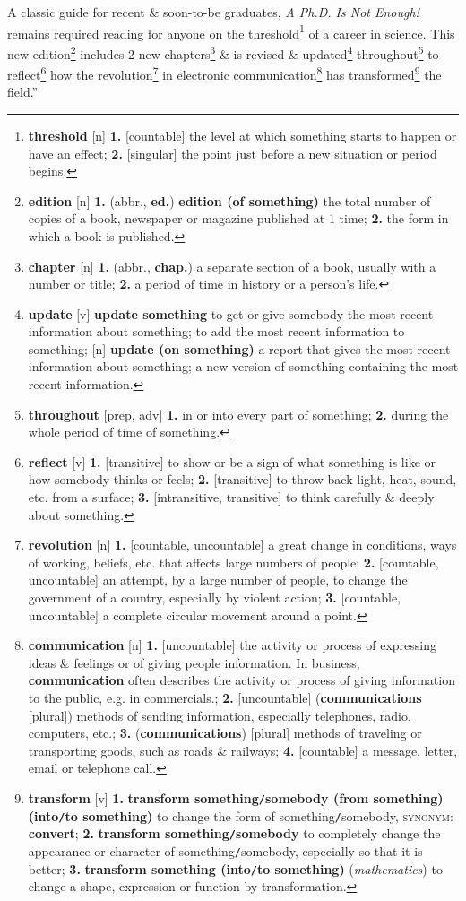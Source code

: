 \documentclass[oneside]{book}
\numberwithin{equation}{section}
\begin{document}
A classic guide for recent \& soon-to-be graduates, \textit{A Ph.D. Is Not Enough!} remains required reading for anyone on the threshold\footnote{\textbf{threshold} [n] \textbf{1.} [countable] the level at which something starts to happen or have an effect; \textbf{2.} [singular] the point just before a new situation or period begins.} of a career in science. This new edition\footnote{\textbf{edition} [n] \textbf{1.} (abbr., \textbf{ed.}) \textbf{edition (of something)} the total number of copies of a book, newspaper or magazine published at 1 time; \textbf{2.} the form in which a book is published.} includes 2 new chapters\footnote{\textbf{chapter} [n] \textbf{1.} (abbr., \textbf{chap.}) a separate section of a book, usually with a number or title; \textbf{2.} a period of time in history or a person's life.} \& is revised \& updated\footnote{\textbf{update} [v] \textbf{update something} to get or give somebody the most recent information about something; to add the most recent information to something; [n] \textbf{update (on something)} a report that gives the most recent information about something; a new version of something containing the most recent information.} throughout\footnote{\textbf{throughout} [prep, adv] \textbf{1.} in or into every part of something; \textbf{2.} during the whole period of time of something.} to reflect\footnote{\textbf{reflect} [v] \textbf{1.} [transitive] to show or be a sign of what something is like or how somebody thinks or feels; \textbf{2.} [transitive] to throw back light, heat, sound, etc. from a surface; \textbf{3.} [intransitive, transitive] to think carefully \& deeply about something.} how the revolution\footnote{\textbf{revolution} [n] \textbf{1.} [countable, uncountable] a great change in conditions, ways of working, beliefs, etc. that affects large numbers of people; \textbf{2.} [countable, uncountable] an attempt, by a large number of people, to change the government of a country, especially by violent action; \textbf{3.} [countable, uncountable] a complete circular movement around a point.} in electronic communication\footnote{\textbf{communication} [n] \textbf{1.} [uncountable] the activity or process of expressing ideas \& feelings or of giving people information. In business, \textbf{communication} often describes the activity or process of giving information to the public, e.g. in commercials.; \textbf{2.} [uncountable] (\textbf{communications} [plural]) methods of sending information, especially telephones, radio, computers, etc.; \textbf{3.} (\textbf{communications}) [plural] methods of traveling or transporting goods, such as roads \& railways; \textbf{4.} [countable] a message, letter, email or telephone call.} has transformed\footnote{\textbf{transform} [v] \textbf{1.} \textbf{transform something\texttt{/}somebody (from something) (into\texttt{/}to something)} to change the form of something\texttt{/}somebody, \textsc{synonym}: \textbf{convert}; \textbf{2.} \textbf{transform something\texttt{/}somebody} to completely change the appearance or character of something\texttt{/}somebody, especially so that it is better; \textbf{3.} \textbf{transform something (into\texttt{/}to something)} (\textit{mathematics}) to change a shape, expression or function by transformation.} the field.''
\end{document}
